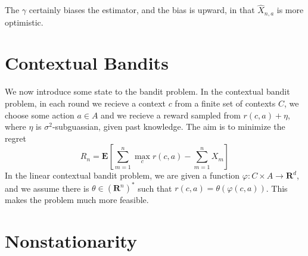 The $\gamma$ certainly biases the estimator, and the bias is upward, in that $\widehat{X}_{n,a}$ is more optimistic.

\section{Contextual Bandits}

We now introduce some state to the bandit problem. In the contextual bandit problem, in each round we recieve a context $c$ from a finite set of contexts $C$, we choose some action $a \in A$ and we recieve a reward sampled from $r(c,a) + \eta$, where $\eta$ is $\sigma^2$-subguassian, given past knowledge. The aim is to minimize the regret
%
\[ R_n = \mathbf{E} \left[ \sum_{m = 1}^n \max_c r(c,a) - \sum_{m = 1}^n X_m \right] \]
%
In the linear contextual bandit problem, we are given a function $\varphi: C \times A \to \mathbf{R}^d$, and we assume there is $\theta \in (\mathbf{R}^n)^*$ such that $r(c,a) = \theta(\varphi(c,a))$. This makes the problem much more feasible.

\section{Nonstationarity}

